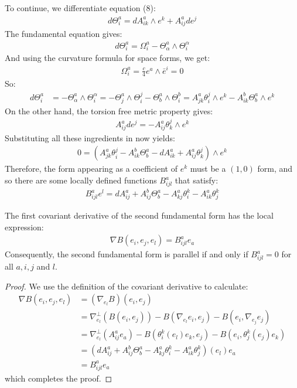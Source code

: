 To continue, we differentiate equation (8):
%
\begin{align*}
d \Theta^a_i = d A^a_{ik} \wedge e^k + A^a_{ij} d e^j
\end{align*}
%
The fundamental equation gives:
%
\begin{align*}
d \Theta^a_i = \Omega^a_i - \Theta^a_{\alpha} \wedge \Theta^{\alpha}_i
\end{align*}
%
And using the curvature formula for space forms, we get:
%
\begin{align*}
\Omega^a_i = \frac{c}{4} e^a \wedge \bar{e}^i = 0
\end{align*}
%
So:
%
\begin{align*}
d \Theta^a_i &= - \Theta^a_{\alpha} \wedge \Theta^{\alpha}_i = - \Theta^a_j \wedge \Theta^j_i - \Theta^a_b \wedge \Theta^b_i = A^a_{jk} \theta^j_i \wedge e^k - A^b_{ik} \Theta^a_b \wedge e^k
\end{align*}
%
On the other hand, the torsion free metric property gives:
%
\begin{align*}
A^a_{ij} d e^j = - A^a_{ij} \theta^j_k \wedge e^k
\end{align*}
%
Substituting all these ingredients in now yields:
%
\begin{align*}
0 = \left( A^a_{jk} \theta^j_i - A^b_{ik} \Theta^a_b - d A^a_{ik} + A^a_{ij} \theta^j_k \right) \wedge e^k
\end{align*}
%
Therefore, the form appearing as a coefficient of $e^k$ must be a $(1,0)$ form, and so there are some locally defined functions $B^a_{ijl}$ that satisfy:
%
\begin{align}
B^a_{ijl} e^l = d A^a_{ij} + A^b_{ij} \Theta^a_b - A^a_{kj} \theta^k_i - A^a_{ik} \theta^k_j
\end{align}

\begin{lem}  The first covariant derivative of the second fundamental form has the local expression:
%
\begin{align*}
\nabla B (e_i, e_j, e_l) = B^a_{ijl} e_a
\end{align*}
%
Consequently, the second fundamental form is parallel if and only if $B^a_{ijl} = 0$ for all $a,i,j$ and $l$.
%
\end{lem}

\begin{proof}  We use the definition of the covariant derivative to calculate:
%
\begin{align*}
\nabla B (e_i, e_j, e_l) &= ( \nabla_{e_l} B )(e_i, e_j) \\
&= \nabla^{\perp}_{e_l} \left( B( e_i, e_j) \right) - B( \nabla_{e_l} e_i, e_j ) - B( e_i, \nabla_{e_j} e_j ) \\
&= \nabla^{\perp}_{e_l} \left( A^a_{ij} e_a \right) - B( \theta^k_i (e_l) e_k, e_j ) - B( e_i, \theta^k_j (e_j) e_k ) \\
&= \left( d A^a_{ij} + A^b_{ij} \Theta^a_b - A^a_{kj} \theta^k_i - A^a_{ik} \theta^k_j \right)(e_l) e_a \\
&= B^a_{ijl} e_a
\end{align*}
%
which completes the proof.
%
\end{proof}

